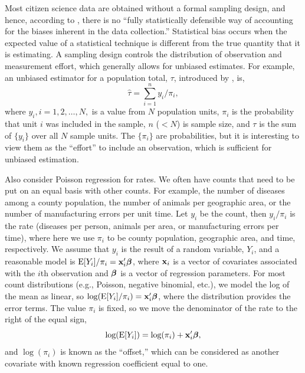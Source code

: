 \documentclass[11pt, titlepage]{article}
\begin{document}
\begin{spacing}{1.9}
\begin{flushleft}
Most citizen science data are obtained without a formal sampling design, and hence, according to \citet{kelling_using_2019}, there is no ``fully statistically defensible way of accounting for the biases inherent in the data collection.'' Statistical bias occurs when the expected value of a statistical technique is different from the true quantity that it is estimating.  A sampling design controls the distribution of observation and measurement effort, which generally allows for unbiased estimates. For example, an unbiased estimator for a population total, $\tau$, introduced by  \citet{horvitz_generalization_1952}, is,
\begin{equation} \label{eq:HorvThom}
  \hat{\tau} = \sum_{i=1}^n y_i/\pi_i,
\end{equation}
where $y_i, i = 1, 2, \ldots, N,$ is a value from $N$ population units, $\pi_i$ is the probability that unit $i$ was included in the sample, $n$ ($< N$) is sample size, and $\tau$ is the sum of $\{y_i\}$ over all $N$ sample units. The $\{\pi_i\}$ are probabilities, but it is interesting to view them as the ``effort'' to include an observation, which is sufficient for unbiased estimation. 

Also consider Poisson regression for rates.  We often have counts that need to be put on an equal basis with other counts.  For example, the number of diseases among a county population, the number of animals per geographic area, or the number of manufacturing errors per unit time.  Let $y_{i}$ be the count, then $y_{i}/\pi_{i}$ is the rate (diseases per person, animals per area, or manufacturing errors per time), where here we use $\pi_{i}$ to be county population, geographic area, and time, respectively.  We assume that $y_{i}$ is the result of a random variable, $Y_{i}$, and a reasonable model is $\textrm{E}[Y_{i}]/\pi_{i} = \mathbf{x}_{i}^{\prime}\mbox{\boldmath $\beta$}$, where $\mathbf{x}_{i}$ is a vector of covariates associated with the $i$th observation and $\mbox{\boldmath $\beta$}$ is a vector of regression parameters.  For most count distributions (e.g., Poisson, negative binomial, etc.), we model the log of the mean as linear, so $\textrm{log}(\textrm{E}[Y_{i}]/\pi_{i}) = \mathbf{x}_{i}^{\prime}\mbox{\boldmath $\beta$}$, where the distribution provides the error terms.  The value $\pi_{i}$ is fixed, so we move the denominator of the rate to the right of the equal sign,
\begin{equation} \label{eq:PoiRegOff}
  \textrm{log}(\textrm{E}[Y_{i}]) = \textrm{log}(\pi_{i}) + \mathbf{x}_{i}^{\prime}\mbox{\boldmath $\beta$},
\end{equation} 
and $\log(\pi_{i})$ is known as the ``offset,'' which can be considered as another covariate with known regression coefficient equal to one.


\end{flushleft}
\end{spacing}
\end{document}
